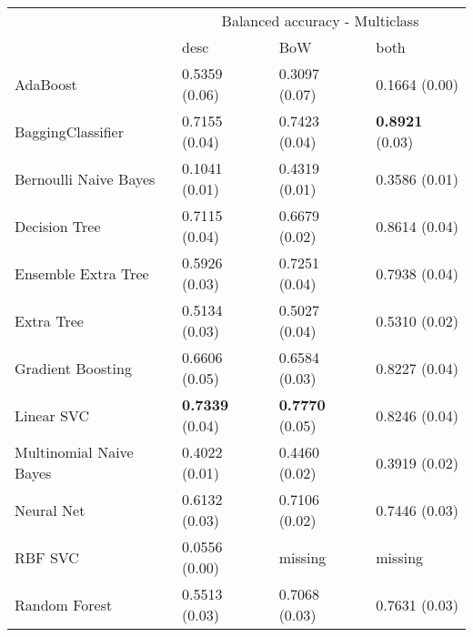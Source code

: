 \begin{tabular}{|l|l|l|l| }
\hline
 &  \multicolumn{3}{c|}{ Balanced accuracy - Multiclass} \\
\cline{2-4} & desc & BoW & both \\ \hline
AdaBoost                & 0.5359 (0.06) & 0.3097 (0.07) & 0.1664 (0.00)\\
BaggingClassifier       & 0.7155 (0.04) & 0.7423 (0.04) & {\bf 0.8921} (0.03)\\
Bernoulli Naive Bayes   & 0.1041 (0.01) & 0.4319 (0.01) & 0.3586 (0.01)\\
Decision Tree           & 0.7115 (0.04) & 0.6679 (0.02) & 0.8614 (0.04)\\
Ensemble Extra Tree     & 0.5926 (0.03) & 0.7251 (0.04) & 0.7938 (0.04)\\
Extra Tree              & 0.5134 (0.03) & 0.5027 (0.04) & 0.5310 (0.02)\\
Gradient Boosting       & 0.6606 (0.05) & 0.6584 (0.03) & 0.8227 (0.04)\\
Linear SVC              & {\bf 0.7339} (0.04) & {\bf 0.7770} (0.05) & 0.8246 (0.04)\\
Multinomial Naive Bayes & 0.4022 (0.01) & 0.4460 (0.02) & 0.3919 (0.02)\\
Neural Net              & 0.6132 (0.03) & 0.7106 (0.02) & 0.7446 (0.03)\\
RBF SVC                 & 0.0556 (0.00) & missing  & missing \\
Random Forest           & 0.5513 (0.03) & 0.7068 (0.03) & 0.7631 (0.03)\\
\hline
\end{tabular}